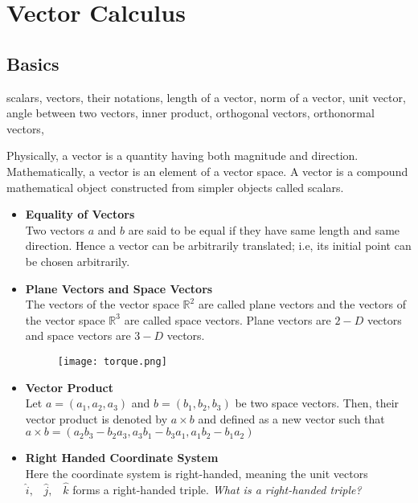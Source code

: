 \documentclass[aima331_lecturenotes_ku.tex]{subfiles}
\begin{document}
\chapter{Vector Calculus}
\section{Basics}
\begin{mdframed}
  scalars, vectors, their notations, length of a vector, norm of a vector, unit vector, angle between two vectors, inner product, orthogonal vectors, orthonormal vectors,
\end{mdframed}
Physically, a vector is a quantity having both magnitude and direction. Mathematically, a vector is an element of a vector space. A vector is a compound mathematical object constructed from simpler objects called scalars.

\begin{itemize}
\item \textbf{Equality of Vectors} \\[1mm]
  Two vectors $a$ and $b$ are said to be equal if they have same length and same direction. Hence a vector can be arbitrarily translated; i.e, its initial point can be chosen arbitrarily.

\item \textbf{Plane Vectors and Space Vectors} \\[1mm]
  The vectors of the vector space $\mathbb{R}^2$ are called plane vectors and the vectors of the vector space $\mathbb{R}^3$ are called space vectors. Plane vectors are $2-D$ vectors and space vectors are $3-D$ vectors.

  \begin{figure}[h]
    \centering
    \texttt{[image: torque.png]}
  \end{figure}

\item \textbf{Vector Product} \\[1mm]
  Let $a=(a_1, a_2, a_3)$ and $b=(b_1, b_2, b_3)$ be two space vectors. Then, their vector product is denoted by $a \times b$ and defined as a new vector such that \\
  $a \times b = (a_2b_3 - b_2a_3, a_3b_1 - b_3a_1, a_1b_2-b_1a_2)$

\item \textbf{Right Handed Coordinate System} \\[1mm]
  Here the coordinate system is right-handed, meaning the unit vectors $\hat{i}, \;\;\; \hat{j}, \;\;\; \hat{k}$ forms a right-handed triple.
  \textit{What is a right-handed triple?}
\end{itemize}
\end{document}

